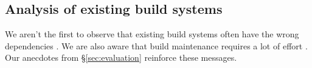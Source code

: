 \subsection{Analysis of existing build systems}

We aren't the first to observe that existing build systems often have the wrong dependencies \cite{detecting_incorrect_build_rules}. We are also aware that build maintenance requires a lot of effort \cite{build_maintenance}. Our anecdotes from \S\ref{sec:evaluation} reinforce these messages.

\begin{comment}
\subsection{Other related work}

The notion of hazards is used extensively in processor design. This is standard terminology.
\end{comment}
